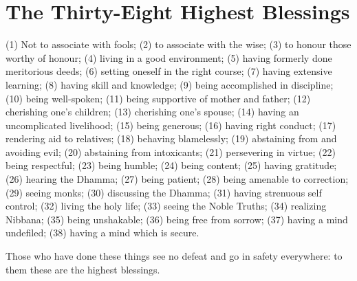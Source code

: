 \clearpage

\section*{The Thirty-Eight Highest Blessings}


(1) Not to associate with fools;
(2) to associate with the wise;
(3) to honour those worthy of honour;
(4) living in a good environment;
(5) having formerly done meritorious deeds;
(6) setting oneself in the right course;
(7) having extensive learning;
(8) having skill and knowledge;
(9) being accomplished in discipline;
(10) being well-spoken;
(11) being supportive of mother and father;
(12) cherishing one's children;
(13) cherishing one's spouse;
(14) having an uncomplicated livelihood;
(15) being generous;
(16) having right conduct;
(17) rendering aid to relatives;
(18) behaving blamelessly;
(19) abstaining from and avoiding evil;
(20) abstaining from intoxicants;
(21) persevering in virtue;
(22) being respectful;
(23) being humble;
(24) being content;
(25) having gratitude;
(26) hearing the Dhamma;
(27) being patient;
(28) being amenable to correction;
(29) seeing monks;
(30) discussing the Dhamma;
(31) having strenuous self control;
(32) living the holy life;
(33) seeing the Noble Truths;
(34) realizing Nibbana;
(35) being unshakable;
(36) being free from sorrow;
(37) having a mind undefiled;
(38) having a mind which is secure.

Those who have done these things see no defeat and go in safety everywhere: to
them these are the highest blessings.


